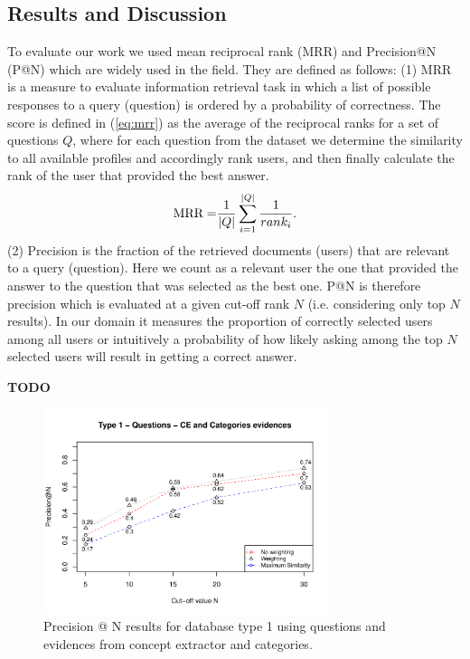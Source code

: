 \documentclass[conference]{IEEEtran}
\newcommand{\TODO}[0]{{\color{BrickRed}\textbf{TODO}}}
\begin{document}
\subsection{Results and Discussion}
To evaluate our work we used mean reciprocal rank (MRR) and Precision@N (P@N) which are widely used in the field. They are defined as follows: (1) MRR is a measure to evaluate information retrieval task in which a list of possible responses to a query (question) is ordered by a probability of correctness. The score is defined in (\ref{eq:mrr}) as the average of the reciprocal ranks for a set of questions $Q$, where for each question from the dataset we determine the similarity to all available profiles and accordingly rank users, and then finally calculate the rank of the user that provided the best answer.
\begin{equation}
	\label{eq:mrr}
	{\rm MRR = }\frac{1}{|Q|}\sum_{i=1}^{|Q|}\frac{1}{rank_i}.
\end{equation}
(2) Precision is the fraction of the retrieved documents (users) that are relevant to a query (question). Here we count as a relevant user the one that provided the answer to the question that was selected as the best one. P@N is therefore precision which is evaluated at a given cut-off rank $N$ (i.e. considering only top $N$ results). In our domain it measures the proportion of correctly selected users among all users or intuitively a probability of how likely asking among the top $N$ selected users will result in getting a correct answer.

\TODO
	
\begin{figure}[!t]
	\centering
	\includegraphics[width=3.3in]{type1questions_PAtN.pdf}
	\caption{Precision @ N results for database type 1 using questions and evidences from concept extractor and categories.}
	\label{fig:pntype1}
\end{figure}
\end{document}
